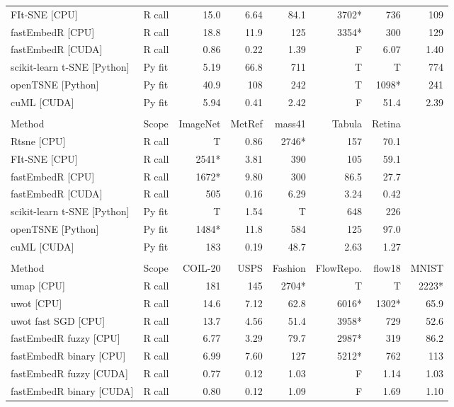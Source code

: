 \begin{longtable}{@{}p{}lrrrrrr@{}}
FIt-SNE [CPU] & R call & 15.0 & 6.64 & 84.1 & 3702* & 736 & 109 \\
fastEmbedR [CPU] & R call & 18.8 & 11.9 & 125 & 3354* & 300 & 129 \\
fastEmbedR [CUDA] & R call & 0.86 & 0.22 & 1.39 & F & 6.07 & 1.40 \\
scikit-learn t-SNE [Python] & Py fit & 5.19 & 66.8 & 711 & T & T & 774 \\
openTSNE [Python] & Py fit & 40.9 & 108 & 242 & T & 1098* & 241 \\
cuML [CUDA] & Py fit & 5.94 & 0.41 & 2.42 & F & 51.4 & 2.39 \\
\addlinespace
\midrule
\multicolumn{8}{@{}l}{\textbf{B. t-SNE, data sets 2/2}} \\
\midrule
Method & Scope & ImageNet & MetRef & mass41 & Tabula & Retina &  \\
\midrule
Rtsne [CPU] & R call & T & 0.86 & 2746* & 157 & 70.1 &  \\
FIt-SNE [CPU] & R call & 2541* & 3.81 & 390 & 105 & 59.1 &  \\
fastEmbedR [CPU] & R call & 1672* & 9.80 & 300 & 86.5 & 27.7 &  \\
fastEmbedR [CUDA] & R call & 505 & 0.16 & 6.29 & 3.24 & 0.42 &  \\
scikit-learn t-SNE [Python] & Py fit & T & 1.54 & T & 648 & 226 &  \\
openTSNE [Python] & Py fit & 1484* & 11.8 & 584 & 125 & 97.0 &  \\
cuML [CUDA] & Py fit & 183 & 0.19 & 48.7 & 2.63 & 1.27 &  \\
\addlinespace
\midrule
\multicolumn{8}{@{}l}{\textbf{C. UMAP, data sets 1/2}} \\
\midrule
Method & Scope & COIL-20 & USPS & Fashion & FlowRepo. & flow18 & MNIST \\
\midrule
umap [CPU] & R call & 181 & 145 & 2704* & T & T & 2223* \\
uwot [CPU] & R call & 14.6 & 7.12 & 62.8 & 6016* & 1302* & 65.9 \\
uwot fast SGD [CPU] & R call & 13.7 & 4.56 & 51.4 & 3958* & 729 & 52.6 \\
fastEmbedR fuzzy [CPU] & R call & 6.77 & 3.29 & 79.7 & 2987* & 319 & 86.2 \\
fastEmbedR binary [CPU] & R call & 6.99 & 7.60 & 127 & 5212* & 762 & 113 \\
fastEmbedR fuzzy [CUDA] & R call & 0.77 & 0.12 & 1.03 & F & 1.14 & 1.03 \\
fastEmbedR binary [CUDA] & R call & 0.80 & 0.12 & 1.09 & F & 1.69 & 1.10 \\

\end{longtable}
